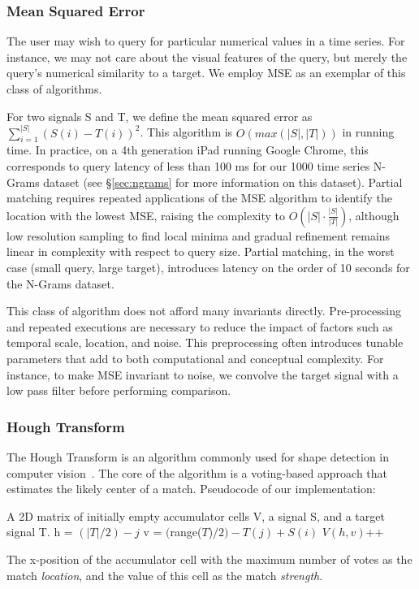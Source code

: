 \subsubsection{Mean Squared Error}
\label{sec:mse}

The user may wish to query for particular numerical values in a time series. For instance, we may not care about the visual features of the query, but merely the query's numerical similarity to a target. We employ MSE as an exemplar of this class of algorithms.

For two signals S and T, we define the mean squared error as $\sum\limits_{i=1}^{|S|} (S(i) - T(i))^2$. This algorithm is $O( max(|S|,|T|))$ in running time. In practice, on a 4th generation iPad running Google Chrome, this corresponds to query latency of less than 100 ms for our 1000 time series N-Grams dataset (see \S\ref{sec:ngrams} for more information on this dataset). Partial matching requires repeated applications of the MSE algorithm to identify the location with the lowest MSE, raising the complexity to $O( |S| \cdot \frac{|S|}{|T|})$, although low resolution sampling to find local minima and gradual refinement remains linear in complexity with respect to query size. Partial matching, in the worst case (small query, large target), introduces latency on the order of 10 seconds for the N-Grams dataset.

This class of algorithm does not afford many invariants directly. Pre-processing and repeated executions are necessary to reduce the impact of factors such as temporal scale, location, and noise. This preprocessing often introduces tunable parameters that add to both computational and conceptual complexity. For instance, to make MSE invariant to noise, we convolve the target signal with a low pass filter before performing comparison.

\subsubsection{Hough Transform}
\label{sec:hough}

\houghFig

The Hough Transform is an algorithm commonly used for shape detection in computer vision~\cite{ballard1981generalizing,illingworth1988survey}. The core of the algorithm is a voting-based approach that estimates the likely center of a match. Pseudocode of our implementation:

\begin{algorithmic}
	\Require A 2D matrix of initially empty accumulator cells V, a signal S, and a target signal T.
	\State h = $(|T|/2) - j$
	\State v = $($range($T$)$/2) - T(j) + S(i)$
	\State $V(h,v)$++
	\EndFor
	\EndFor
	
	\State \Return The x-position of the accumulator cell with the maximum number of votes as the match \emph{location}, and the value of this cell as the match \emph{strength}.
\end{algorithmic}

